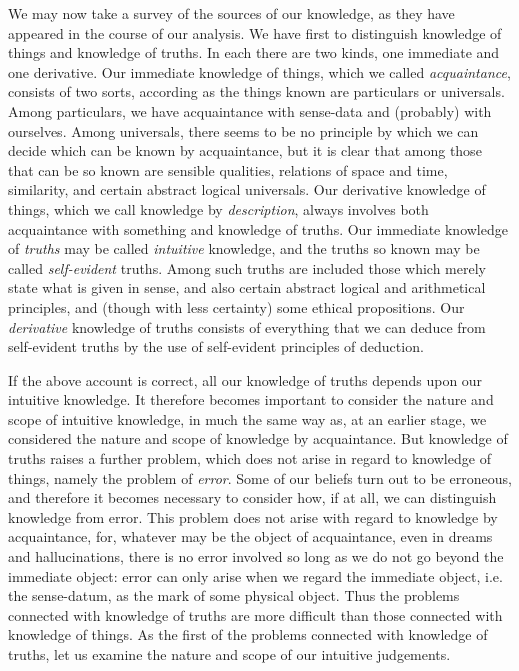 \documentclass[oneside,letterpaper,12pt]{book}
\begin{document}
We may now take a survey of the sources of our knowledge, as they have
appeared in the course of our analysis. We have first to distinguish
knowledge of things and knowledge of truths. In each there are two
kinds, one immediate and one derivative. \label{immediate} Our immediate knowledge of
things, which we called \emph{acquaintance}, consists of two sorts,
according as the things known are particulars or universals. Among
particulars, we have acquaintance with sense-data and (probably) with
ourselves. Among universals, there seems to be no principle by which we
can decide which can be known by acquaintance, but it is clear that
among those that can be so known are sensible qualities, relations of
space and time, similarity, and certain abstract logical universals. Our
derivative knowledge of things, which we call knowledge by
\emph{description}, always involves both acquaintance with something and
knowledge of truths. Our immediate knowledge of \emph{truths} may be
called \emph{intuitive} knowledge, and the truths so known may be called
\emph{self-evident} truths. Among such truths are included those which
merely state what is given in sense, and also certain abstract logical
and arithmetical principles, and (though with less certainty) some
ethical propositions. Our \emph{derivative} knowledge of truths consists
of everything that we can deduce from self-evident truths by the use of
self-evident principles of deduction.

If the above account is correct, all our knowledge of truths depends
upon our intuitive knowledge. It therefore becomes important to consider
the nature and scope of intuitive knowledge, in much the same way as, at
an earlier stage, we considered the nature and scope of knowledge by
acquaintance. But knowledge of truths raises a further problem, which
does not arise in regard to knowledge of things, namely the problem of
\emph{error}. Some of our beliefs turn out to be erroneous, and
therefore it becomes necessary to consider how, if at all, we can
distinguish knowledge from error. This problem does not arise with
regard to knowledge by acquaintance, for, whatever may be the object of
acquaintance, even in dreams and hallucinations, there is no error
involved so long as we do not go beyond the immediate object: error can
only arise when we regard the immediate object, i.e. the sense-datum, as
the mark of some physical object. Thus the problems connected with
knowledge of truths are more difficult than those connected with
knowledge of things. As the first of the problems connected with
knowledge of truths, let us examine the nature and scope of our
intuitive judgements.
\end{document}
